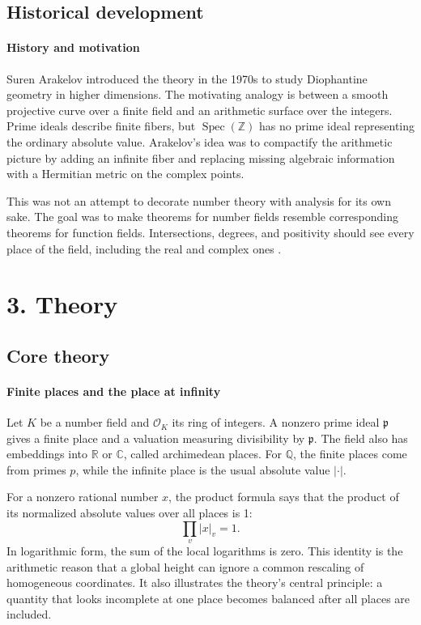 \subsection*{Historical development}
\begin{historylist}
\paragraph{History and motivation}

Suren Arakelov introduced the theory in the 1970s to study Diophantine geometry in higher dimensions. The motivating analogy is between a smooth projective curve over a finite field and an arithmetic surface over the integers. Prime ideals describe finite fibers, but $\operatorname{Spec}(\mathbb Z)$ has no prime ideal representing the ordinary absolute value. Arakelov's idea was to compactify the arithmetic picture by adding an infinite fiber and replacing missing algebraic information with a Hermitian metric on the complex points.

This was not an attempt to decorate number theory with analysis for its own sake. The goal was to make theorems for number fields resemble corresponding theorems for function fields. Intersections, degrees, and positivity should see every place of the field, including the real and complex ones \cite{arakelov_theory_ref2,arakelov_theory_ref4}.

\end{historylist}
\section*{3. Theory}
\subsection*{Core theory}
\paragraph{Finite places and the place at infinity}

Let $K$ be a number field and $\mathcal O_K$ its ring of integers. A nonzero prime ideal $\mathfrak p$ gives a finite place and a valuation measuring divisibility by $\mathfrak p$. The field also has embeddings into $\mathbb R$ or $\mathbb C$, called archimedean places. For $\mathbb Q$, the finite places come from primes $p$, while the infinite place is the usual absolute value $|\cdot|$.

For a nonzero rational number $x$, the product formula says that the product of its normalized absolute values over all places is 1:
\[
 \prod_v |x|_v=1.
\]
In logarithmic form, the sum of the local logarithms is zero. This identity is the arithmetic reason that a global height can ignore a common rescaling of homogeneous coordinates. It also illustrates the theory's central principle: a quantity that looks incomplete at one place becomes balanced after all places are included.


